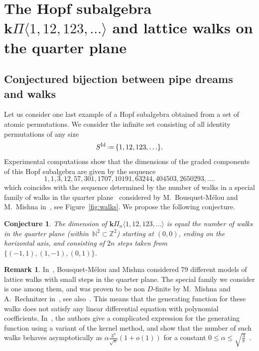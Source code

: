 \documentclass{amsart}
\newtheorem{conjecture}[theorem]{Conjecture}
\theoremstyle{definition}
\newtheorem{remark}[theorem]{Remark}
\newcommand{\bk}{\mathbf{k}} %
\newcommand{\eqdef}{\mbox{\,\raisebox{0.2ex}{\scriptsize\ensuremath{\mathrm:}}\ensuremath{=}\,}} %
\newcommand{\fref}[1]{Figure~\ref{#1}} %
\newcommand{\pipeDreams}{\Pi} %
\newcommand{\HP}{{\bk\pipeDreams}} %
\newcommand{\Sid}{S^{\operatorname{Id}}} %
\begin{document}
\section{The Hopf subalgebra $\HP \langle 1, 12, 123, \dots \rangle$ and lattice walks on the quarter plane}
\label{sec:matomic}


\subsection{Conjectured bijection between pipe dreams and walks}
\label{subsec:conjecturedBijection}

Let us consider one last example of a Hopf subalgebra obtained from a set of atomic permutations.
We consider the infinite set consisting of all identity permutations of any size
\[
\Sid \eqdef \{1, 12, 123, \ldots\}.
\] 
Experimental computations show that the dimensions of the graded components of this Hopf subalgebra are given by the sequence 
\[1, 1, 3, 12, 57, 301, 1707, 10191, 63244, 404503, 2650293, .\dots\]
which coincides with the sequence determined by the number of walks in a special family of walks in the quarter plane~\href{https://oeis.org/A151498}{\cite[A151498]{OEIS}} considered by M.~Bousquet-M\'elou and M.~Mishna in~\cite{BousquetMelouMishna}, see \fref{fig:walks}. We propose the following conjecture.

\begin{conjecture}
\label{conj:walks1}
The dimension of $\HP_n \langle 1, 12, 123, \dots \rangle$ is equal the number of walks in the quarter plane (within~$\mathbb{N}^2\subset \mathbb{Z}^2$) starting at $(0,0)$, ending on the horizontal axis, and consisting of $2n$ steps taken from $\{(-1, 1), (1, -1), (0, 1)\}$.
\end{conjecture}

\begin{remark}
\label{rem:latticewalksEnumeration}
In~\cite{BousquetMelouMishna}, Bousquet-M\'elou and Mishna considered 79 different models of lattice walks with small steps in the quarter plane. 
The special family we consider is one among them, and was proven to be non $D$-finite by M.~Mishna and A.~Rechnitzer in~\cite{MishnaRechnitzer}, see also~\cite{MelczerMishna}. 
This means that the generating function for these walks does not satisfy any linear differential equation with polynomial coefficients. 
In~\cite{MishnaRechnitzer, MelczerMishna}, the authors give a complicated expression for  the generating function using a variant of the kernel method, 
and show that the number of such walks behaves asymptotically as $\alpha \frac{3^n}{\sqrt{n}}(1+o(1))$ 
for a constant $0\leq \alpha \leq \sqrt{\frac{3}{\pi}}$~\cite[Prop.~16]{MishnaRechnitzer}.
\end{remark}
\end{document}
